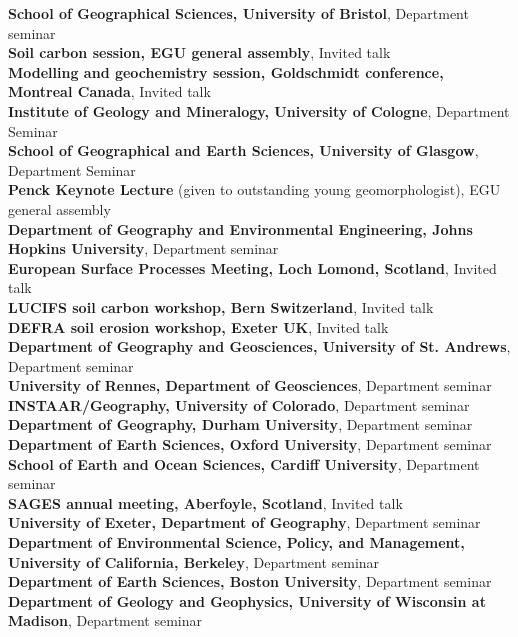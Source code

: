 \documentclass[10pt, a4paper]{article}
\newcommand{\years}[1]{\marginnote{\scriptsize #1}}
\begin{document}
\textbf{School of Geographical Sciences, University of Bristol}, Department seminar\\[0.05cm]  
\years{2012}\textbf{Soil carbon session, EGU general assembly}, Invited talk\\[0.05cm]
\textbf{Modelling and geochemistry session, Goldschmidt conference, Montreal Canada}, Invited talk\\[0.05cm]
\textbf{Institute of Geology and Mineralogy, University of Cologne}, Department Seminar\\[0.05cm]
\textbf{School of Geographical and Earth Sciences, University of Glasgow}, Department Seminar\\[0.05cm]
\years{2011}\textbf{Penck Keynote Lecture} (given to outstanding young geomorphologist), EGU general assembly\\[0.05cm]
\textbf{Department of Geography and Environmental Engineering, Johns Hopkins University}, Department seminar\\[0.05cm]
\textbf{European Surface Processes Meeting, Loch Lomond, Scotland}, Invited talk\\[0.05cm]
\textbf{LUCIFS soil carbon workshop, Bern Switzerland}, Invited talk\\[0.05cm]
\textbf{DEFRA soil erosion workshop, Exeter UK}, Invited talk\\[0.05cm]
\years{2010}\textbf{Department of Geography and Geosciences, University of St. Andrews}, Department seminar\\[0.05cm]
\textbf{University of Rennes, Department of Geosciences}, Department seminar\\[0.05cm]
\years{2009}\textbf{INSTAAR/Geography, University of Colorado}, Department seminar\\[0.05cm]
\textbf{Department of Geography, Durham University}, Department seminar\\[0.05cm]
\textbf{Department of Earth Sciences, Oxford University}, Department seminar\\[0.05cm]
\textbf{School of Earth and Ocean Sciences, Cardiff University}, Department seminar\\[0.05cm]
\years{2008}\textbf{SAGES annual meeting, Aberfoyle, Scotland}, Invited talk\\[0.05cm]
\years{2007}\textbf{University of Exeter, Department of Geography}, Department seminar\\[0.05cm]
\years{2006}\textbf{Department of Environmental Science, Policy, and Management, University of California, Berkeley}, Department seminar\\[0.05cm]
\textbf{Department of Earth Sciences, Boston University}, Department seminar\\[0.05cm]
\textbf{Department of Geology and Geophysics, University of Wisconsin at Madison}, Department seminar\\[0.05cm]
\end{document}
